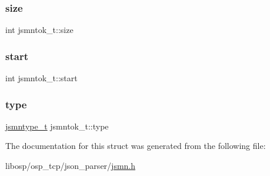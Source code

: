 \subsubsection{\texorpdfstring{size}{size}}
{\footnotesize\ttfamily int jsmntok\+\_\+t\+::size}

\mbox{\label{structjsmntok__t_a0a8f55d0095f268ce8e224fe1234acd0}} 
\subsubsection{\texorpdfstring{start}{start}}
{\footnotesize\ttfamily int jsmntok\+\_\+t\+::start}

\mbox{\label{structjsmntok__t_ac03dbd6b83cbcd979eb64702d5b9943e}} 
\subsubsection{\texorpdfstring{type}{type}}
{\footnotesize\ttfamily \mbox{\hyperlink{jsmn_8h_a065320719769f9dc1fbe30094e52802f}{jsmntype\+\_\+t}} jsmntok\+\_\+t\+::type}



The documentation for this struct was generated from the following file\+:\begin{DoxyCompactItemize}
\item 
libosp/osp\+\_\+tcp/json\+\_\+parser/\mbox{\hyperlink{jsmn_8h}{jsmn.\+h}}\end{DoxyCompactItemize}
